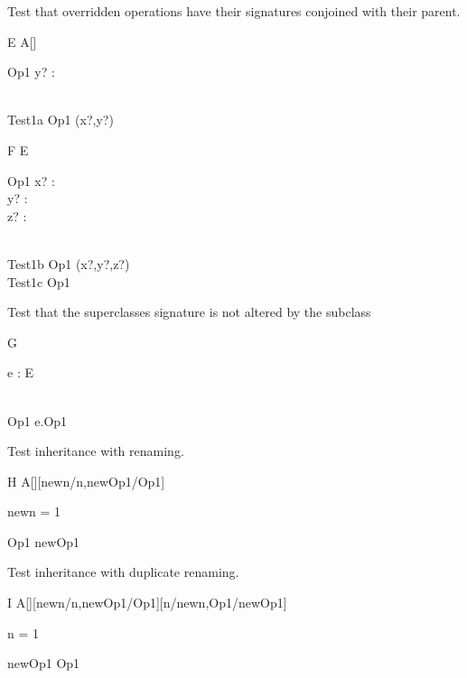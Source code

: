 Test that overridden operations have their signatures conjoined with
their parent.
\begin{class}{E}
  A[\nat]\\
  \begin{op}{Op1}
    y? : \power\nat
  \end{op}\\
  Test1a \sdef Op1 \hide (x?,y?)
\end{class}

\begin{class}{F}
  E\\
  \begin{op}{Op1}
    x? : \nat\\
    y? : \power \nat\\
    z? : \power\power \nat
  \end{op}\\
  Test1b \sdef Op1 \hide (x?,y?,z?)\\
  Test1c \sdef Op1 
\end{class}

Test that the superclasses signature is not altered by the subclass
\begin{class}{G}
  \begin{state}
    e : E
  \end{state}\\
  Op1 \sdef e.Op1 \land [z? : \nat]
\end{class}

Test inheritance with renaming.
\begin{class}{H}
  A[\nat][newn/n,newOp1/Op1]\\
  \begin{state}
  \where
    newn = 1
  \end{state}
  Op1 \sdef newOp1
\end{class}

Test inheritance with duplicate renaming.
\begin{class}{I}
  A[\nat][newn/n,newOp1/Op1][n/newn,Op1/newOp1]\\
  \begin{state}
  \where
    n = 1
  \end{state}
  newOp1 \sdef Op1
\end{class}
